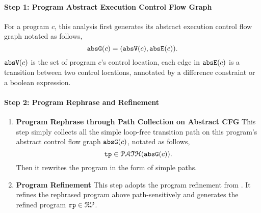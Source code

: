 \paragraph{Step 1: Program Abstract Execution Control Flow Graph}
For a program $c$, this analysis first generates its abstract execution control flow graph notated as follows,
\[\mathtt{abs}{\mathtt{G}}(c) =(\mathtt{abs}{\mathtt{V}}(c), \mathtt{abs}{\mathtt{E}}(c)).\]
%
$\mathtt{abs}{\mathtt{V}}(c)$ is the set of program $c$'s control location, each edge in $\mathtt{abs}{\mathtt{E}}(c)$ is a transition
between two control locations, annotated by a difference constraint \cite{sinn2017complexity} or a boolean expression.
\paragraph{Step 2: Program Rephrase and Refinement}
\begin{enumerate}
  \item \textbf{ Program Rephrase through Path Collection on Abstract CFG}
  This step simply collects all the simple loop-free transition path
  on this program's abstract control flow graph $\mathtt{abs}{\mathtt{G}}(c)$, notated as follows,
  \[ \mathtt{tp} \in \mathcal{PATH}(\mathtt{abs}{\mathtt{G}}(c)). \]
  Then it rewrites the program in the form of simple paths.
  \item \textbf{ Program Refinement} This step adopts the program refinement from \cite{GulwaniJK09}.
  It refines the rephrased program above path-sensitively and generates the refined program 
  $\mathtt{rp} \in \mathcal{RP}$.
  \end{enumerate}
